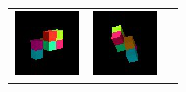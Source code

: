 \begin{figure}[tbp]
\begin{center}
\begin{tabular}{ccc}
\begin{minipage}{0.2\linewidth}
\begin{center}
          \includegraphics[width=\linewidth]{./figures/context_2.png}
        \end{center}
      \end{minipage} &
      \begin{minipage}{0.2\linewidth}
        \begin{center}
          \includegraphics[width=\linewidth]{./figures/context_3.png}

\end{center}
\end{minipage}
\end{tabular}
\end{center}
\end{figure}
